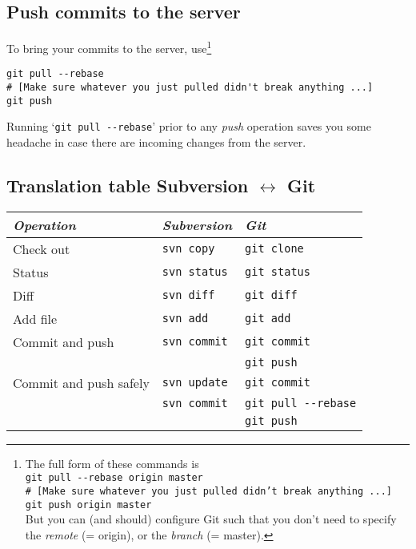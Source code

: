 \documentclass[12pt,pdftex]{article}
\begin{document}
\subsection{Push commits to the server}

To bring your commits to the server, use\footnote{%
  The full form of these commands is\\
  \noindent\mbox{}\qquad\qquad  \texttt{git pull -{}-rebase origin master}\\
  \noindent\mbox{}\qquad\qquad \texttt{\# [Make sure whatever you just pulled didn't break anything ...]}\\
  \noindent\mbox{}\qquad\qquad \texttt{git push origin master}\\
  But you can (and should) configure Git such that you don't need to specify
  the \emph{remote} (= origin), or the \emph{branch} (= master).%
}
\begin{lstlisting}
git pull --rebase
# [Make sure whatever you just pulled didn't break anything ...]
git push
\end{lstlisting}
Running ‘\texttt{git pull -{}-rebase}’ prior to any \emph{push} operation
saves you some headache in case there are incoming changes from the
server.


\subsection{Translation table Subversion \(\leftrightarrow\) Git}

\begin{center}
\begin{tabular}{lll}
\toprule
\emph{Operation} & \emph{Subversion} & \emph{Git}\\
\midrule
Check out & \texttt{svn copy} & \texttt{git clone}\\
\midrule
Status & \texttt{svn status} & \texttt{git status}\\
\midrule
Diff & \texttt{svn diff} & \texttt{git diff}\\
\midrule
Add file & \texttt{svn add} & \texttt{git add}\\
\midrule
Commit and push & \texttt{svn commit} & \texttt{git commit}\\
 &  & \texttt{git push}\\
\midrule
Commit and push safely & \texttt{svn update} & \texttt{git commit}\\
 & \texttt{svn commit} & \texttt{git pull -{}-rebase}\\
 &  & \texttt{git push}\\
\bottomrule
\end{tabular}
\end{center}
\end{document}

